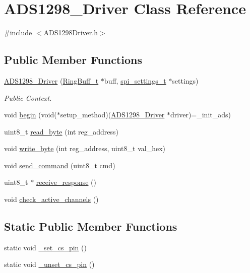 \hypertarget{class_a_d_s1298___driver}{\section{\-A\-D\-S1298\-\_\-\-Driver \-Class \-Reference}
\label{class_a_d_s1298___driver}
}


{\ttfamily \#include $<$\-A\-D\-S1298\-Driver.\-h$>$}

\subsection*{\-Public \-Member \-Functions}
\begin{DoxyCompactItemize}
\item 
\hyperlink{class_a_d_s1298___driver_a9a858be68754f5889a524671c62cd464}{\-A\-D\-S1298\-\_\-\-Driver} (\hyperlink{struct_ring_buff__t}{\-Ring\-Buff\-\_\-t} $\ast$buff, \hyperlink{structspi__settings__t}{spi\-\_\-settings\-\_\-t} $\ast$settings)
\begin{DoxyCompactList}\small\item\em \-Public \-Context. \end{DoxyCompactList}\item 
void \hyperlink{class_a_d_s1298___driver_a409f362235fcabe35b3f60b1bfe660fc}{begin} (void($\ast$setup\-\_\-method)(\hyperlink{class_a_d_s1298___driver}{\-A\-D\-S1298\-\_\-\-Driver} $\ast$driver)=\-\_\-init\-\_\-ads)
\item 
uint8\-\_\-t \hyperlink{class_a_d_s1298___driver_a34536e6af6330e36161c1e629ccde82f}{read\-\_\-byte} (int reg\-\_\-address)
\item 
void \hyperlink{class_a_d_s1298___driver_a1b9a12caf872c4d5cbc43ae390a3e883}{write\-\_\-byte} (int reg\-\_\-address, uint8\-\_\-t val\-\_\-hex)
\item 
void \hyperlink{class_a_d_s1298___driver_af386ede321d263b13634c21ccd24d2dc}{send\-\_\-command} (uint8\-\_\-t cmd)
\item 
uint8\-\_\-t $\ast$ \hyperlink{class_a_d_s1298___driver_aa495b39d758bb510e1689cfa51c6b354}{receive\-\_\-response} ()
\item 
void \hyperlink{class_a_d_s1298___driver_a4a170ee3c4cf3d3f213add153205ae53}{check\-\_\-active\-\_\-channels} ()
\end{DoxyCompactItemize}
\subsection*{\-Static \-Public \-Member \-Functions}
\begin{DoxyCompactItemize}
\item 
static void \hyperlink{class_a_d_s1298___driver_a52c1a31eba1b18263d749d9b01b8ab99}{\-\_\-set\-\_\-cs\-\_\-pin} ()
\item 
static void \hyperlink{class_a_d_s1298___driver_a95a3e2c4377acb9e937f8544d38cf64c}{\-\_\-unset\-\_\-cs\-\_\-pin} ()
\end{DoxyCompactItemize}
